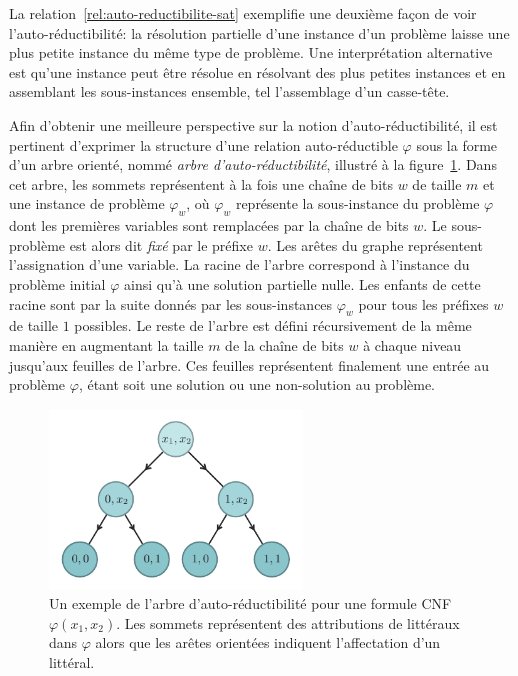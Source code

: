 La relation~\ref{rel:auto-reductibilite-sat} exemplifie une deuxième façon de voir l'auto-réductibilité: la résolution partielle d'une instance d'un problème laisse une plus petite instance du même type de problème. Une interprétation alternative est qu'une instance peut être résolue en résolvant des plus petites instances et en assemblant les sous-instances ensemble, tel l'assemblage d'un casse-tête. 

Afin d'obtenir une meilleure perspective sur la notion d'auto-réductibilité, il est pertinent d'exprimer la structure d'une relation auto-réductible $\varphi$ sous la forme d'un arbre orienté, nommé \textit{arbre d'auto-réductibilité}, illustré à la figure~\ref{fig:arbre-auto-reductibilite}. Dans cet arbre, les sommets représentent à la fois une chaîne de bits $w$ de taille $m$ et une instance de problème $\varphi_{w}$, où $\varphi_{w}$ représente la sous-instance du problème $\varphi$ dont les premières variables sont remplacées par la chaîne de bits $w$. Le sous-problème est alors dit \textit{fixé} par le préfixe $w$. Les arêtes du graphe représentent l'assignation d'une variable. La racine de l'arbre correspond à l'instance du problème initial $\varphi$ ainsi qu'à une solution partielle nulle. Les enfants de cette racine sont par la suite donnés par les sous-instances $\varphi_{w}$ pour tous les préfixes $w$ de taille $1$ possibles. Le reste de l'arbre est défini récursivement de la même manière en augmentant la taille $m$ de la chaîne de bits $w$ à chaque niveau jusqu'aux feuilles de l'arbre. Ces feuilles représentent finalement une entrée au problème $\varphi$, étant soit une solution ou une non-solution au problème.

\begin{figure}[h]
    \centering
    \includegraphics[width=0.6\textwidth]{figures/self-reducibility-tree.pdf}
    \caption[Arbre d'auto-réductibilité]{Un exemple de l'arbre d'auto-réductibilité pour une formule CNF $\varphi(x_{1}, x_{2})$. Les sommets représentent des attributions de littéraux dans $\varphi$ alors que les arêtes orientées indiquent l'affectation d'un littéral.}
    \label{fig:arbre-auto-reductibilite}
\end{figure}

